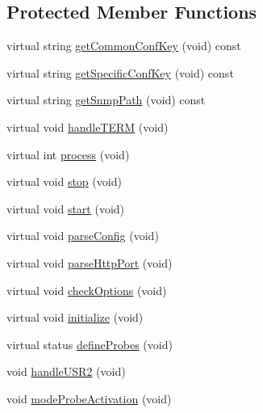 \subsection*{Protected Member Functions}
\begin{DoxyCompactItemize}
\item 
virtual string \hyperlink{classxtd_1_1servers_1_1app_1_1HttpServer_a3c838a2599ff485454ca19790ae0529c}{get\+Common\+Conf\+Key} (void) const 
\item 
virtual string \hyperlink{classxtd_1_1servers_1_1app_1_1HttpServer_a2b8fdc59d125cae41a833da5daf16d97}{get\+Specific\+Conf\+Key} (void) const 
\item 
virtual string \hyperlink{classxtd_1_1servers_1_1app_1_1HttpServer_affc53261a7c36873c73a06013d6b1fe6}{get\+Snmp\+Path} (void) const 
\item 
virtual void \hyperlink{classxtd_1_1servers_1_1app_1_1HttpServer_a022eecad815296f1d27b19a4b6cca908}{handle\+T\+E\+RM} (void)
\item 
virtual int \hyperlink{classxtd_1_1servers_1_1app_1_1HttpServer_a2b52e7d39c3b1937a4802bf7c3d159f8}{process} (void)
\item 
virtual void \hyperlink{classxtd_1_1servers_1_1app_1_1HttpServer_a7fdba08e0fa4dc9bbec30a989ccf4049}{stop} (void)
\item 
virtual void \hyperlink{classxtd_1_1servers_1_1app_1_1HttpServer_a6fac87218bf8d69ef6baeb56819411f9}{start} (void)
\item 
virtual void \hyperlink{classxtd_1_1servers_1_1app_1_1HttpServer_af4baf6c6e7397177a20122e1f1101f9f}{parse\+Config} (void)
\item 
virtual void \hyperlink{classxtd_1_1servers_1_1app_1_1HttpServer_a2b65812ed2afa6629f115b76c4ab6e41}{parse\+Http\+Port} (void)
\item 
virtual void \hyperlink{classxtd_1_1servers_1_1app_1_1HttpServer_a381e3736b9c8fa89891da50b29ad8ae9}{check\+Options} (void)
\item 
virtual void \hyperlink{classxtd_1_1servers_1_1app_1_1HttpServer_a0924e53b6bc9de7563c33690d619ce9d}{initialize} (void)
\item 
virtual status \hyperlink{classxtd_1_1servers_1_1app_1_1HttpServer_a66c2a3b5bca8390d96b35daebfccabf3}{define\+Probes} (void)
\item 
void \hyperlink{classxtd_1_1servers_1_1app_1_1HttpServer_a6c6bb7c70218f171e327ed2197d0f6dc}{handle\+U\+S\+R2} (void)
\item 
void \hyperlink{classxtd_1_1servers_1_1app_1_1HttpServer_a4b2a904b65659aa4e5d67d1ad4a02603}{mode\+Probe\+Activation} (void)

\end{DoxyCompactItemize}
